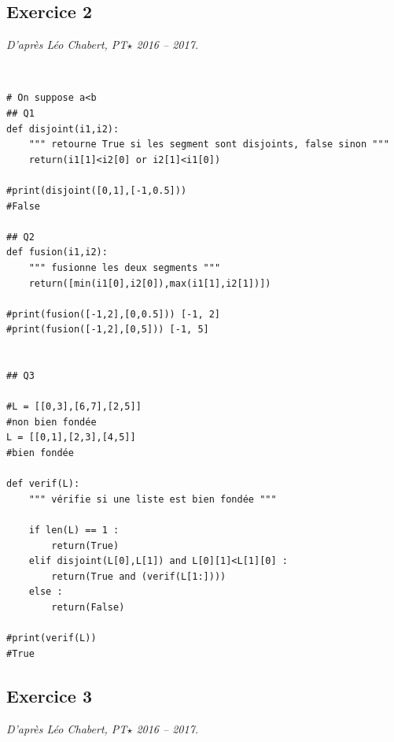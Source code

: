 \documentclass[10pt,fleqn]{article} %
\begin{document}
\subsection*{Exercice 2}
\textit{D'après Léo Chabert, PT$\star$ 2016 -- 2017.}

\begin{corrige}
$\quad$
\begin{lstlisting}
# On suppose a<b
## Q1
def disjoint(i1,i2):
    """ retourne True si les segment sont disjoints, false sinon """
    return(i1[1]<i2[0] or i2[1]<i1[0])

#print(disjoint([0,1],[-1,0.5]))
#False

## Q2
def fusion(i1,i2):
    """ fusionne les deux segments """
    return([min(i1[0],i2[0]),max(i1[1],i2[1])])

#print(fusion([-1,2],[0,0.5])) [-1, 2]
#print(fusion([-1,2],[0,5])) [-1, 5]


## Q3

#L = [[0,3],[6,7],[2,5]]
#non bien fondée
L = [[0,1],[2,3],[4,5]]
#bien fondée

def verif(L):
    """ vérifie si une liste est bien fondée """

    if len(L) == 1 :
        return(True)
    elif disjoint(L[0],L[1]) and L[0][1]<L[1][0] :
        return(True and (verif(L[1:])))
    else :
        return(False)
    
#print(verif(L))
#True
\end{lstlisting}
\end{corrige}

\subsection*{Exercice 3}
\textit{D'après Léo Chabert, PT$\star$ 2016 -- 2017.}
\end{document}
